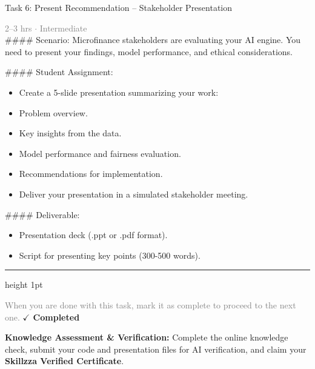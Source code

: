 \documentclass[10pt,a4paper]{article}
\begin{document}
\begin{taskbox}{Task 6: Present Recommendation – Stakeholder Presentation}

    {\small \textcolor{gray}{2--3 hrs $\cdot$ Intermediate}}\\[12pt]

    \#\#\#\# Scenario:
Microfinance stakeholders are evaluating your AI engine. You need to present your findings, model performance, and ethical considerations.

\#\#\#\# Student Assignment:
\begin{itemize}
    \item Create a 5-slide presentation summarizing your work:
    \item Problem overview.
    \item Key insights from the data.
    \item Model performance and fairness evaluation.
    \item Recommendations for implementation.
    \item Deliver your presentation in a simulated stakeholder meeting.
\end{itemize}

\#\#\#\# Deliverable:
\begin{itemize}
    \item Presentation deck (.ppt or .pdf format).
    \item Script for presenting key points (300-500 words).\par
\end{itemize}

    \vspace{16pt}

    \textcolor{cardBorder}{\hrule height 1pt}\vspace{8pt}

    \small \textcolor{gray}{When you are done with this task, mark it as complete to proceed to the next one.} \hfill \textbf{\textcolor{brandDark}{$\checkmark$ Completed}}

\end{taskbox}

\begin{completionbox}
    \textbf{Knowledge Assessment \& Verification:} Complete the online knowledge check, submit your code and presentation files for AI verification, and claim your \textbf{Skillzza Verified Certificate}.
\end{completionbox}

\newpage
\end{document}
